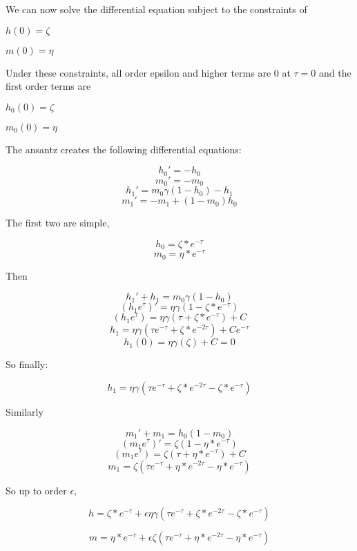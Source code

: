 \documentclass{article}
\begin{document}
We can now solve the differential equation subject to the constraints of 

$h(0) = \zeta$

$m(0) = \eta$

Under these constraints, all order epsilon and higher terms are 0 at $\tau = 0$ and the first order terms are

$h_0(0) = \zeta$

$m_0(0) = \eta$

The ansantz creates the following differential equations: 

  $$ h_0' =  - h_0$$
  $$ m_0' =  - m_0$$
  $$ h_1' = m_0  \gamma (1-h_0) - h_1$$
  $$ m_1' = - m_1 +(1-m_0)h_0$$
  
  The first two are simple,
  
    $$ h_0 =  \zeta * e^{-\tau}$$
    $$ m_0 =  \eta * e^{-\tau}$$
    
  Then 
  
    $$ h_1' + h_1 = m_0  \gamma (1-h_0)$$
    $$ (h_1e^{\tau})' = \eta \gamma (1 -  \zeta * e^{-\tau})$$
    $$ (h_1e^{\tau}) = \eta \gamma (\tau +  \zeta * e^{-\tau}) + C$$
    $$ h_1 = \eta \gamma (\tau e^{-\tau} +  \zeta * e^{-2\tau}) + Ce^{-\tau}$$
    $$h_1(0) = \eta \gamma ( \zeta ) + C = 0$$
    
    So finally: 
  
      $$ h_1 = \eta \gamma (\tau e^{-\tau} +  \zeta * e^{-2\tau} - \zeta * e^{-\tau})$$
  
  Similarly
  
    $$ m_1' + m_1 = h_0  (1-m_0)$$
    $$ (m_1e^{\tau})' = \zeta (1 -  \eta * e^{-\tau})$$
    $$ (m_1e^{\tau}) = \zeta  (\tau +  \eta * e^{-\tau}) + C$$
    $$ m_1 = \zeta (\tau e^{-\tau} +  \eta * e^{-2\tau} - \eta * e^{-\tau}) $$
    
So up to order $\epsilon$,

$$h = \zeta * e^{-\tau} + \epsilon \eta \gamma (\tau e^{-\tau} +  \zeta * e^{-2\tau} - \zeta * e^{-\tau})$$

$$m = \eta * e^{-\tau} + \epsilon \zeta  (\tau e^{-\tau} +  \eta * e^{-2\tau}- \eta * e^{-\tau})$$
  
\end{document}
